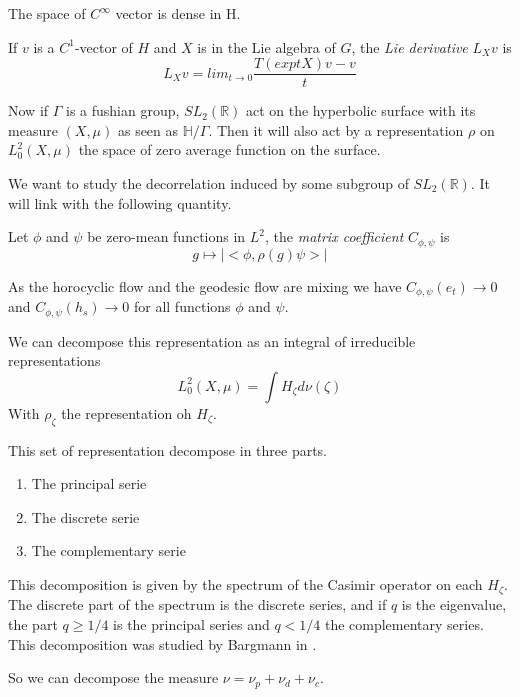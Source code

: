 \begin{rmq}
The space of $C^{\infty}$ vector is dense in H.
\end{rmq}

\begin{dfnt}
If $v$ is a $C^1$-vector of $H$ and $X$ is in the Lie algebra of $G$, the \emph{Lie derivative} $L_X v$ is \[
L_X v =lim_{t \to 0} \frac{T(exp tX)v-v}{t}
\]
\end{dfnt}

Now if $\Gamma$ is a fushian group, $SL_2(\mathbb{R})$ act on the hyperbolic surface with its measure $(X,\mu)$ as seen as $\mathbb{H}/ \Gamma$.
Then it will also act by a representation $\rho$ on $L^2_0(X,\mu)$ the space of zero average function on the surface.

We want to study the decorrelation induced by some subgroup of $SL_2(\mathbb{R})$. It will link with the following quantity.

\begin{dfnt}
Let $\phi$ and $\psi$ be zero-mean functions in $L^2$, the \emph{matrix coefficient} $C_{\phi,\psi}$ is\[
g \mapsto |<\phi, \rho(g) \psi>|
\]
\end{dfnt}

\begin{rmq}
As the horocyclic flow and the geodesic flow are mixing we have $C_{\phi,\psi}(e_t) \to 0$ and $C_{\phi,\psi}(h_s) \to 0$ for all functions $\phi$ and $\psi$.
\end{rmq}

We can decompose this representation as an integral of irreducible representations \[
L^2_0(X,\mu)=\int H_\zeta d \nu(\zeta)
\]
With $\rho_{\zeta}$ the representation oh $H_{\zeta}$.

This set of representation decompose in three parts. \begin{enumerate}
\item The principal serie
\item The discrete serie
\item The complementary serie
\end{enumerate}

This decomposition is given by the spectrum of the Casimir operator on each $H_\zeta$.
The discrete part of the spectrum is the discrete series, and if $q$ is the eigenvalue, the part $q \geq 1/4$ is the principal series and $q < 1/4$ the complementary series. This decomposition was studied by Bargmann in \cite{10.2307/1969129}.

So we can decompose the measure $\nu=\nu_p + \nu_d + \nu_c$.

